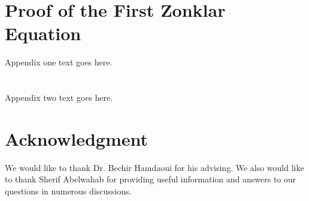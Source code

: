 \documentclass[12pt,journal]{IEEEtran}
\begin{document}

%


\appendices
\section{Proof of the First Zonklar Equation}
Appendix one text goes here.

\section{}
Appendix two text goes here.


\section*{Acknowledgment}
We would like to thank Dr. Bechir Hamdaoui for his advising. We also would like to thank Sherif Abelwahab for providing useful information and answers to our questions in numerous discussions.



\ifCLASSOPTIONcaptionsoff
  \newpage
\fi
\end{document}
